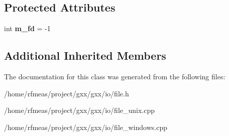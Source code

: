 \subsection*{Protected Attributes}
\begin{DoxyCompactItemize}
\item 
int {\bfseries m\+\_\+fd} = -\/1\hypertarget{classgxx_1_1io_1_1file_a019ef1fc1faa4195cf015b6f8ebbf4db}{}\label{classgxx_1_1io_1_1file_a019ef1fc1faa4195cf015b6f8ebbf4db}

\end{DoxyCompactItemize}
\subsection*{Additional Inherited Members}


The documentation for this class was generated from the following files\+:\begin{DoxyCompactItemize}
\item 
/home/rfmeas/project/gxx/gxx/io/file.\+h\item 
/home/rfmeas/project/gxx/gxx/io/file\+\_\+unix.\+cpp\item 
/home/rfmeas/project/gxx/gxx/io/file\+\_\+windows.\+cpp\end{DoxyCompactItemize}
